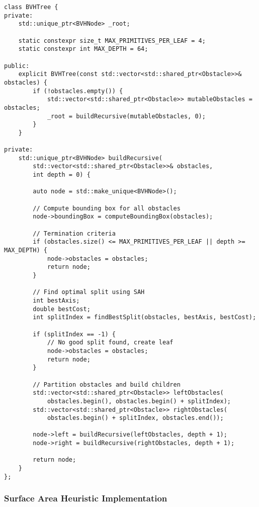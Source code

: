 \begin{lstlisting}[caption={BVH Tree Construction Algorithm}, label={lst:bvh_construction}]
class BVHTree {
private:
    std::unique_ptr<BVHNode> _root;
    
    static constexpr size_t MAX_PRIMITIVES_PER_LEAF = 4;
    static constexpr int MAX_DEPTH = 64;
    
public:
    explicit BVHTree(const std::vector<std::shared_ptr<Obstacle>>& obstacles) {
        if (!obstacles.empty()) {
            std::vector<std::shared_ptr<Obstacle>> mutableObstacles = obstacles;
            _root = buildRecursive(mutableObstacles, 0);
        }
    }
    
private:
    std::unique_ptr<BVHNode> buildRecursive(
        std::vector<std::shared_ptr<Obstacle>>& obstacles,
        int depth = 0) {
        
        auto node = std::make_unique<BVHNode>();
        
        // Compute bounding box for all obstacles
        node->boundingBox = computeBoundingBox(obstacles);
        
        // Termination criteria
        if (obstacles.size() <= MAX_PRIMITIVES_PER_LEAF || depth >= MAX_DEPTH) {
            node->obstacles = obstacles;
            return node;
        }
        
        // Find optimal split using SAH
        int bestAxis;
        double bestCost;
        int splitIndex = findBestSplit(obstacles, bestAxis, bestCost);
        
        if (splitIndex == -1) {
            // No good split found, create leaf
            node->obstacles = obstacles;
            return node;
        }
        
        // Partition obstacles and build children
        std::vector<std::shared_ptr<Obstacle>> leftObstacles(
            obstacles.begin(), obstacles.begin() + splitIndex);
        std::vector<std::shared_ptr<Obstacle>> rightObstacles(
            obstacles.begin() + splitIndex, obstacles.end());
        
        node->left = buildRecursive(leftObstacles, depth + 1);
        node->right = buildRecursive(rightObstacles, depth + 1);
        
        return node;
    }
};
\end{lstlisting}

\subsubsection{Surface Area Heuristic Implementation}


